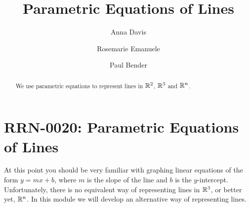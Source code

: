 \documentclass{ximera}
\author{Anna Davis \and Rosemarie Emanuele \and Paul Bender} \title{Parametric Equations of Lines} \license{CC-BY 4.0}
\begin{document}
\begin{abstract}
  We use parametric equations to represent lines in $\mathbb{R}^2$, $\mathbb{R}^3$ and $\mathbb{R}^n$.
\end{abstract}
\maketitle

\section*{RRN-0020:  Parametric Equations of Lines}

At this point you should be very familiar with graphing linear equations of the form $y=mx+b$, where $m$ is the slope of the line and $b$ is the $y$-intercept.  Unfortunately, there is no equivalent way of representing lines in $\mathbb{R}^3$, or better yet, $\mathbb{R}^n$.  In this module we will develop an alternative way of representing lines.
\end{document}
